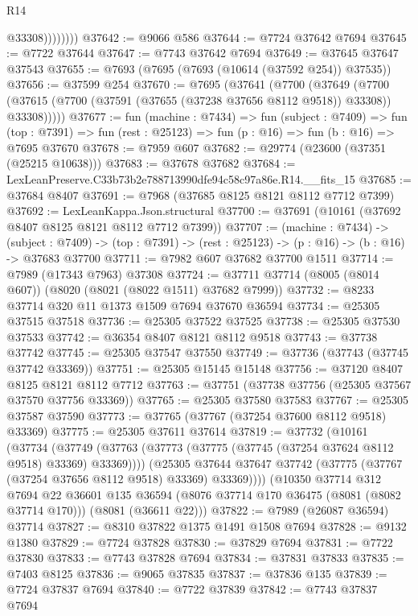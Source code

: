 \begin{lexlean}{R14}
\begin{coremodule}
                    @33308))))))))
@37642 := @9066 @586
@37644 := @7724 @37642 @7694
@37645 := @7722 @37644
@37647 := @7743 @37642 @7694
@37649 := @37645 @37647 @37543
@37655 := @7693 (@7695 (@7693 (@10614 (@37592 @254)) @37535))
@37656 := @37599 @254
@37670 := @7695
    (@37641
      (@7700
        (@37649
          (@7700 (@37615 (@7700 (@37591 (@37655 (@37238 @37656 @8112 @9518)) @33308)) @33308)))))
@37677 := fun (machine : @7434) =>
  fun (subject : @7409) =>
  fun (top : @7391) => fun (rest : @25123) => fun (p : @16) => fun (b : @16) => @7695 @37670
@37678 := @7959 @607
@37682 := @29774 (@23600 (@37351 (@25215 @10638)))
@37683 := @37678 @37682
@37684 := LexLeanPreserve.C33b73b2e788713990dfe94c58c97a86e.R14.__fits_15
@37685 := @37684 @8407
@37691 := @7968 (@37685 @8125 @8121 @8112 @7712 @7399)
@37692 := LexLeanKappa.Json.structural
@37700 := @37691 (@10161 (@37692 @8407 @8125 @8121 @8112 @7712 @7399))
@37707 := (machine : @7434) ->
  (subject : @7409) -> (top : @7391) -> (rest : @25123) -> (p : @16) -> (b : @16) -> @37683 @37700
@37711 := @7982 @607 @37682 @37700 @1511
@37714 := @7989 (@17343 @7963) @37308
@37724 := @37711 @37714 (@8005 (@8014 @607)) (@8020 (@8021 (@8022 @1511) @37682 @7999))
@37732 := @8233 @37714 @320 @11 @1373 @1509 @7694 @37670 @36594
@37734 := @25305 @37515 @37518
@37736 := @25305 @37522 @37525
@37738 := @25305 @37530 @37533
@37742 := @36354 @8407 @8121 @8112 @9518
@37743 := @37738 @37742
@37745 := @25305 @37547 @37550
@37749 := @37736 (@37743 (@37745 @37742 @33369))
@37751 := @25305 @15145 @15148
@37756 := @37120 @8407 @8125 @8121 @8112 @7712
@37763 := @37751 (@37738 @37756 (@25305 @37567 @37570 @37756 @33369))
@37765 := @25305 @37580 @37583
@37767 := @25305 @37587 @37590
@37773 := @37765 (@37767 (@37254 @37600 @8112 @9518) @33369)
@37775 := @25305 @37611 @37614
@37819 := @37732
    (@10161
      (@37734
        (@37749 (@37763 (@37773 (@37775 (@37745 (@37254 @37624 @8112 @9518) @33369) @33369))))
        (@25305 @37644 @37647 @37742 (@37775 (@37767 (@37254 @37656 @8112 @9518) @33369) @33369))))
    (@10350
      @37714
      @312
      @7694
      @22
      @36601
      @135
      @36594
      (@8076 @37714 @170 @36475 (@8081 (@8082 @37714 @170)))
      (@8081 (@36611 @22)))
@37822 := @7989 (@26087 @36594) @37714
@37827 := @8310 @37822 @1375 @1491 @1508 @7694
@37828 := @9132 @1380
@37829 := @7724 @37828
@37830 := @37829 @7694
@37831 := @7722 @37830
@37833 := @7743 @37828 @7694
@37834 := @37831 @37833
@37835 := @7403 @8125
@37836 := @9065 @37835
@37837 := @37836 @135
@37839 := @7724 @37837 @7694
@37840 := @7722 @37839
@37842 := @7743 @37837 @7694

\end{coremodule}
\end{lexlean}

